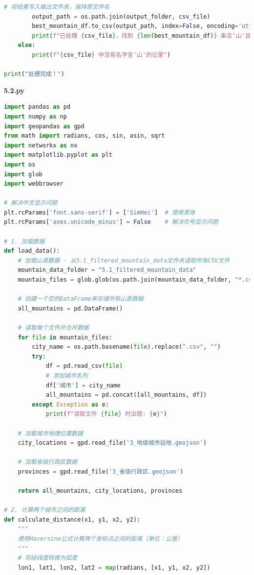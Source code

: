 \documentclass[withoutpreface,bwprint]{cumcmthesis} %
\begin{document}
\begin{appendices}
\begin{lstlisting}[language=python]
        # 将结果写入输出文件夹，保持原文件名
        output_path = os.path.join(output_folder, csv_file)
        best_mountain_df.to_csv(output_path, index=False, encoding='utf-8')
        print(f"已处理 {csv_file}，找到 {len(best_mountain_df)} 条含'山'且评分最高的记录")
    else:
        print(f"{csv_file} 中没有名字含'山'的记录")

print("处理完成！")

 \end{lstlisting}








 \textbf{5.2.py}
\begin{lstlisting}[language=python]
import pandas as pd
import numpy as np
import geopandas as gpd
from math import radians, cos, sin, asin, sqrt
import networkx as nx
import matplotlib.pyplot as plt
import os
import glob
import webbrowser

# 解决中文显示问题
plt.rcParams['font.sans-serif'] = ['SimHei']  # 使用黑体
plt.rcParams['axes.unicode_minus'] = False    # 解决负号显示问题

# 1. 加载数据
def load_data():
    # 加载山景数据 - 从5.1_filtered_mountain_data文件夹读取所有CSV文件
    mountain_data_folder = "5.1_filtered_mountain_data"
    mountain_files = glob.glob(os.path.join(mountain_data_folder, "*.csv"))
    
    # 创建一个空的DataFrame来存储所有山景数据
    all_mountains = pd.DataFrame()
    
    # 读取每个文件并合并数据
    for file in mountain_files:
        city_name = os.path.basename(file).replace(".csv", "")
        try:
            df = pd.read_csv(file)
            # 添加城市名列
            df['城市'] = city_name
            all_mountains = pd.concat([all_mountains, df])
        except Exception as e:
            print(f"读取文件 {file} 时出错: {e}")
    
    # 加载城市地理位置数据
    city_locations = gpd.read_file('3_地级城市驻地.geojson')
    
    # 加载省级行政区数据
    provinces = gpd.read_file('3_省级行政区.geojson')
    
    return all_mountains, city_locations, provinces

# 2. 计算两个城市之间的距离
def calculate_distance(x1, y1, x2, y2):
    """
    使用Haversine公式计算两个坐标点之间的距离（单位：公里）
    """
    # 将经纬度转换为弧度
    lon1, lat1, lon2, lat2 = map(radians, [x1, y1, x2, y2])
    

\end{lstlisting}
\end{appendices}
\end{document}
